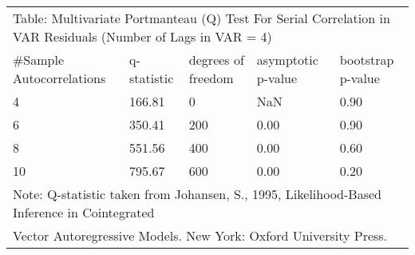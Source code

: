 \documentclass{article}
\begin{document}
 \begin{tabular}{lllll} 
 \multicolumn{5}{l}{Table: Multivariate Portmanteau (Q) Test For Serial 
     Correlation in VAR Residuals (Number of Lags in VAR =  4)} \\ 
 \#Sample Autocorrelations & q-statistic & degrees of freedom & asymptotic 
     p-value & bootstrap p-value \\ 
   4   & 166.81 &   0 &  NaN & 0.90 \\  
   6   & 350.41 & 200 & 0.00 & 0.90 \\  
   8   & 551.56 & 400 & 0.00 & 0.60 \\  
  10   & 795.67 & 600 & 0.00 & 0.20 \\ 
 \multicolumn{5}{l}{Note: Q-statistic taken from Johansen, S., 1995, 
 Likelihood-Based Inference in Cointegrated } \\  
 \multicolumn{5}{l}{Vector Autoregressive Models. New York: Oxford University 
 Press.} 
   \end{tabular} 
\end{document}
